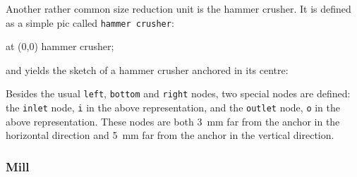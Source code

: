 \documentclass[12pt]{article}						%
\newcommand*{\chpn}[1]{\texttt{#1}}				%
\newcommand*{\chpp}[1]{\texttt{#1}}				%
\begin{document}
Another rather common size reduction unit is the hammer crusher. It is defined as
a simple pic called \chpp{hammer crusher}:
\begin{chpcode}
	\pic at (0,0) {hammer crusher};
\end{chpcode}
and yields the sketch of a hammer crusher anchored in its centre:
\begin{center}

\end{center}

Besides the usual \chpn{left}, \chpn{bottom} and \chpn{right} nodes, two special
nodes are defined: the \chpn{inlet} node, \chpn{i} in the above representation,
and the \chpn{outlet} node, \chpn{o} in the above representation. These nodes are
both \SI{3}{\mm} far from the anchor in the horizontal direction and \SI{5}{\mm}
far from the anchor in the vertical direction.

\subsubsection{Mill}
\end{document}
